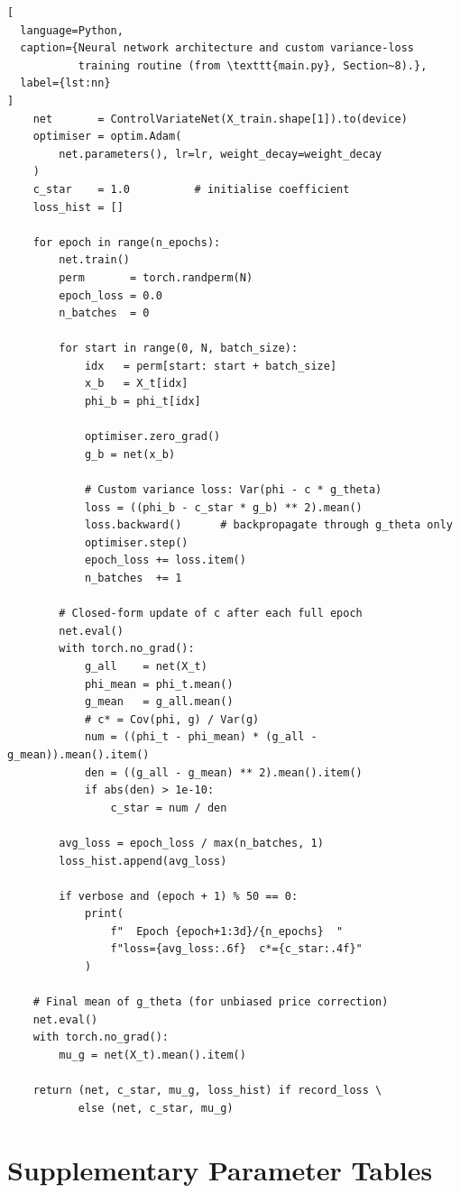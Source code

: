 \begin{lstlisting}[
  language=Python,
  caption={Neural network architecture and custom variance-loss
           training routine (from \texttt{main.py}, Section~8).},
  label={lst:nn}
]
    net       = ControlVariateNet(X_train.shape[1]).to(device)
    optimiser = optim.Adam(
        net.parameters(), lr=lr, weight_decay=weight_decay
    )
    c_star    = 1.0          # initialise coefficient
    loss_hist = []

    for epoch in range(n_epochs):
        net.train()
        perm       = torch.randperm(N)
        epoch_loss = 0.0
        n_batches  = 0

        for start in range(0, N, batch_size):
            idx   = perm[start: start + batch_size]
            x_b   = X_t[idx]
            phi_b = phi_t[idx]

            optimiser.zero_grad()
            g_b = net(x_b)

            # Custom variance loss: Var(phi - c * g_theta)
            loss = ((phi_b - c_star * g_b) ** 2).mean()
            loss.backward()      # backpropagate through g_theta only
            optimiser.step()
            epoch_loss += loss.item()
            n_batches  += 1

        # Closed-form update of c after each full epoch
        net.eval()
        with torch.no_grad():
            g_all    = net(X_t)
            phi_mean = phi_t.mean()
            g_mean   = g_all.mean()
            # c* = Cov(phi, g) / Var(g)
            num = ((phi_t - phi_mean) * (g_all - g_mean)).mean().item()
            den = ((g_all - g_mean) ** 2).mean().item()
            if abs(den) > 1e-10:
                c_star = num / den

        avg_loss = epoch_loss / max(n_batches, 1)
        loss_hist.append(avg_loss)

        if verbose and (epoch + 1) % 50 == 0:
            print(
                f"  Epoch {epoch+1:3d}/{n_epochs}  "
                f"loss={avg_loss:.6f}  c*={c_star:.4f}"
            )

    # Final mean of g_theta (for unbiased price correction)
    net.eval()
    with torch.no_grad():
        mu_g = net(X_t).mean().item()

    return (net, c_star, mu_g, loss_hist) if record_loss \
           else (net, c_star, mu_g)
\end{lstlisting}

\chapter{Supplementary Parameter Tables}
\label{app:params}

